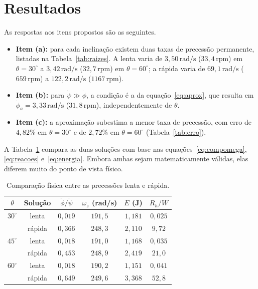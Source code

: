 \documentclass[12pt,a4paper]{article}
\newcommand{\un}[1]{\,\mathrm{#1}}
\newcommand{\phid}{\dot{\phi}}
\newcommand{\psid}{\dot{\psi}}
\begin{document}
\section{Resultados}

As respostas aos itens propostos são as seguintes.

\begin{itemize}
\item \textbf{Item (a):} para cada inclinação existem duas taxas de precessão permanente, listadas na Tabela~\ref{tab:raizes}. A lenta varia de $3,50\un{rad/s}$ ($33,4\un{rpm}$) em $\theta=30^\circ$ a $3,42\un{rad/s}$ ($32,7\un{rpm}$) em $\theta=60^\circ$; a rápida varia de $69,1\un{rad/s}$ ($659\un{rpm}$) a $122,2\un{rad/s}$ ($1167\un{rpm}$).
\item \textbf{Item (b):} para $\psid\gg\phid$, a condição é a da equação~\ref{eq:aprox}, que resulta em $\phid_a=3,33\un{rad/s}$ ($31,8\un{rpm}$), independentemente de $\theta$.
\item \textbf{Item (c):} a aproximação subestima a menor taxa de precessão, com erro de $4,82\%$ em $\theta=30^\circ$ e de $2,72\%$ em $\theta=60^\circ$ (Tabela~\ref{tab:erro}).
\end{itemize}

A Tabela~\ref{tab:fisica} compara as duas soluções com base nas equações~\ref{eq:compomega}, \ref{eq:reacoes} e~\ref{eq:energia}. Embora ambas sejam matematicamente válidas, elas diferem muito do ponto de vista físico.

\begin{table}[H]
\centering
\caption{Comparação física entre as precessões lenta e rápida.}
\label{tab:fisica}
\begin{tabular}{cccccc}
\toprule
$\theta$ & Solução & $\phid/\psid$ & $\omega_z$ (rad/s) & $E$ (J) & $R_h/W$\\
\midrule
$30^\circ$ & lenta & $0,019$ & $191,5$ & $1,181$ & $0,025$\\
           & rápida & $0,366$ & $248,3$ & $2,110$ & $9,72$\\
$45^\circ$ & lenta & $0,018$ & $191,0$ & $1,168$ & $0,035$\\
           & rápida & $0,453$ & $248,9$ & $2,419$ & $21,0$\\
$60^\circ$ & lenta & $0,018$ & $190,2$ & $1,151$ & $0,041$\\
           & rápida & $0,649$ & $249,6$ & $3,368$ & $52,8$\\
\bottomrule
\end{tabular}
\end{table}
\end{document}

